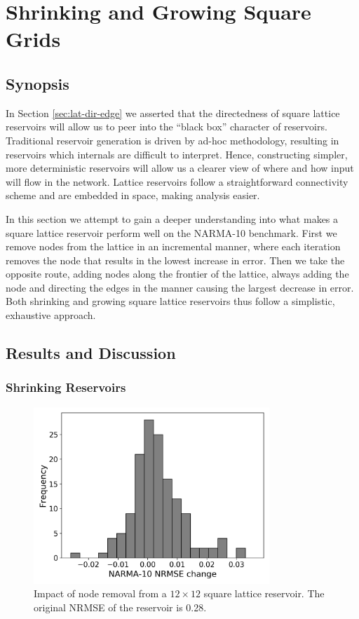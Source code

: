 \section{Shrinking and Growing Square Grids}
\label{sec:shrink-grow}

\subsection{Synopsis}

In Section \ref{sec:lat-dir-edge} we asserted that the directedness of square
lattice reservoirs will allow us to peer into the ``black box'' character of
reservoirs. Traditional reservoir generation is driven by ad-hoc methodology,
resulting in reservoirs which internals are difficult to interpret. Hence,
constructing simpler, more deterministic reservoirs will allow us a clearer view
of where and how input will flow in the network. Lattice reservoirs follow a
straightforward connectivity scheme and are embedded in space, making analysis
easier.

In this section we attempt to gain a deeper understanding into what makes a
square lattice reservoir perform well on the NARMA-10 benchmark. First we remove
nodes from the lattice in an incremental manner, where each iteration removes
the node that results in the lowest increase in error. Then we take the opposite
route, adding nodes along the frontier of the lattice, always adding the node
and directing the edges in the manner causing the largest decrease in
error. Both shrinking and growing square lattice reservoirs thus follow a
simplistic, exhaustive approach.

\subsection{Results and Discussion}

\subsubsection{Shrinking Reservoirs}

\begin{figure}
  \centering
  \includegraphics[width=3.5in]{figures/removal-hist.png}
  \caption{
    Impact of node removal from a $12 \times 12$ square lattice reservoir. The
original NRMSE of the reservoir is 0.28.
  }
  \label{fig:rt-removal-hist}
\end{figure}

